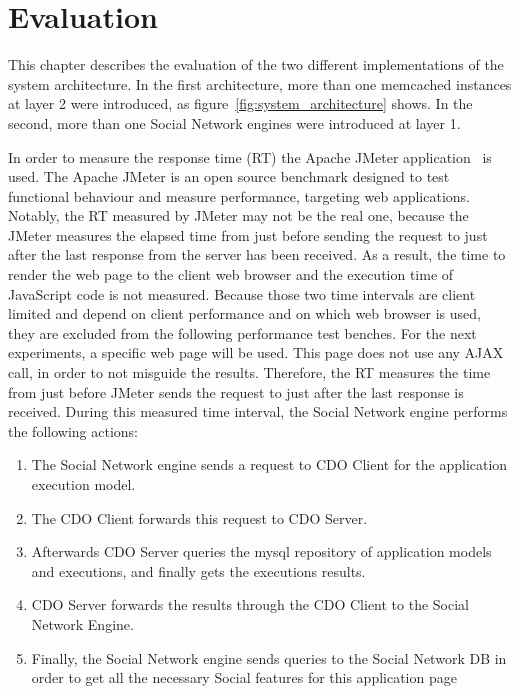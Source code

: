 \chapter{Evaluation}
\label{chapt:evaluation}

This chapter describes the evaluation of the two different implementations of the system architecture. In the first architecture, more than one memcached instances at layer 2 were introduced, as figure~\ref{fig:system_architecture} shows. In the second, more than one Social Network engines were introduced at layer 1.

In order to measure the response time (RT) the Apache JMeter application~\cite{jmeter_url} is used. The Apache JMeter is an open source benchmark designed to test functional behaviour and  measure performance, targeting web applications. Notably, the RT measured by JMeter may not be the real one, because the JMeter measures the elapsed time from just before sending the request to just after the last response from the server has been received. As a result, the time to render the web page to the client web browser and the execution time of JavaScript code is not measured. Because those two time intervals are client limited and depend on client performance and on which web browser is used, they are excluded from the following performance test benches. For the next experiments, a specific web page will be used. This page does not use any AJAX call, in order to not misguide the results. Therefore, the RT measures the time from just before JMeter sends the request to just after the last response is received. During this measured time interval, the Social Network engine performs the following actions:
\begin{enumerate}[I]
\item The Social Network engine sends a request to CDO Client for the application execution model.
\item The CDO Client forwards this request to CDO Server.
\item Afterwards CDO Server queries the mysql repository of application models and executions, and finally gets the executions results.
\item CDO Server forwards the results through the CDO Client to the Social Network Engine.
\item Finally, the Social Network engine sends queries to the Social Network DB in order to get all the necessary Social features for this application page
\end{enumerate}

